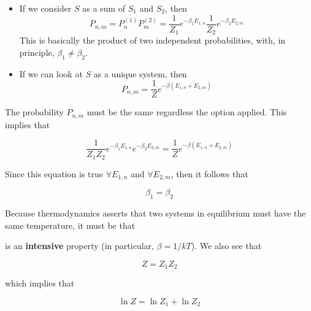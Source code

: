 \documentclass[12pt,a4paper]{report}
\newcommand{\esp}{\vspace{0.5cm}}
\begin{document}
\begin{itemize}
	\item If we consider $S$ as a sum of $S_1$ and $S_2$, then
	\begin{equation}
		P_{n,m} = P_n^{(1)} P_m^{(2)} = \frac{1}{Z_1} e^{-\beta_1 E_{1,n}} \frac{1}{Z_2} e^{-\beta_2 E_{2,m}} \tag{5.26}
	\end{equation}
	This is basically the product of two independent probabilities, with, in principle, $\beta_1 \neq \beta_2$.
	
	\esp
	
	\item If we can look at $S$ as a unique system, then
	\begin{equation}
		P_{n,m} = \frac{1}{Z} e^{-\beta(E_{1,n} + E_{2,m})} \tag{5.27}
	\end{equation}
\end{itemize}

\esp

The probability $P_{n,m}$ must be the same regardless the option applied. This implies that

\esp

\begin{equation}
	\frac{1}{Z_1 Z_2} e^{-\beta_1 E_{1,n}} e^{-\beta_2 E_{2,m}} = \frac{1}{Z} e^{-\beta(E_{1,n} + E_{2,m})} \tag{5.28}
\end{equation}

\esp

Since this equation is true $\forall E_{1,n}$ and $\forall E_{2,m}$, then it follows that

\esp

\begin{equation}
	\beta_1 = \beta_2 \tag{5.29}
\end{equation}

\esp

Because thermodynamics asserts that two systems in equilibrium must have the same temperature, it must be that

\esp

is an \textbf{intensive} property (in particular, $\beta = 1/kT$). We also see that

\esp

\begin{equation}
	Z = Z_1 Z_2 \tag{5.31}
\end{equation}

\esp

which implies that

\esp

\begin{equation}
	\ln Z = \ln Z_1 + \ln Z_2 \tag{5.32}
\end{equation}
\end{document}
